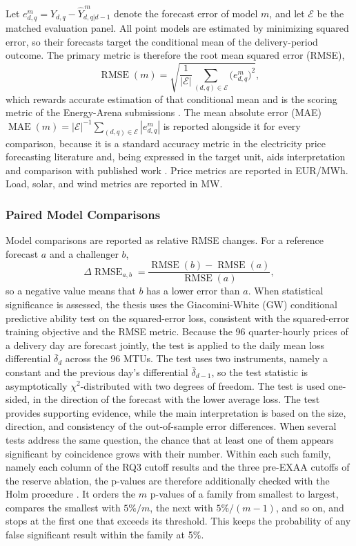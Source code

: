 Let \(e^{m}_{d,q} = Y_{d,q} - \hat{Y}^{\,m}_{d,q|d-1}\) denote the forecast
error of model \(m\), and let \(\mathcal{E}\) be the matched evaluation panel.
All point models are estimated by minimizing squared error, so their forecasts
target the conditional mean of the delivery-period outcome. The primary metric
is therefore the root mean squared error (RMSE),
\[
  \operatorname{RMSE}(m)
  =
  \sqrt{\frac{1}{|\mathcal{E}|}
  \sum_{(d,q)\in\mathcal{E}}
  \bigl(e^{m}_{d,q}\bigr)^{2}},
\]
which rewards accurate estimation of that conditional mean and is the scoring
metric of the Energy-Arena submissions \cite{kleinebrahm2026energyarena}. The
mean absolute error (MAE)
\(\operatorname{MAE}(m) = |\mathcal{E}|^{-1} \sum_{(d,q)\in\mathcal{E}}
|e^{m}_{d,q}|\) is reported alongside it for every comparison, because it is a
standard accuracy metric in the electricity price forecasting literature and,
being expressed in the target unit, aids interpretation and comparison with
published work \cite{lago2021forecasting,hyndman2006another}. Price metrics are
reported in EUR/MWh. Load, solar, and wind
metrics are reported in MW.

\subsubsection{Paired Model Comparisons}
\label{sec:paired_model_comparisons}

Model comparisons are reported as relative RMSE changes. For a reference
forecast \(a\) and a challenger \(b\),
\[
  \Delta\operatorname{RMSE}_{a,b}
  =
  \frac{\operatorname{RMSE}(b) - \operatorname{RMSE}(a)}{\operatorname{RMSE}(a)},
\]
so a negative value means that \(b\) has a lower error than \(a\). When
statistical significance is assessed, the thesis uses the Giacomini-White (GW)
conditional predictive ability test \cite{giacomini2006tests} on the
squared-error loss, consistent with the squared-error training objective and the
RMSE metric. Because the 96 quarter-hourly prices of a delivery day are
forecast jointly, the test is applied to the daily mean loss differential
\(\bar{\delta}_{d}\) across the 96 MTUs. The test uses two instruments,
namely a constant and the previous day's differential \(\bar{\delta}_{d-1}\), so
the test statistic is asymptotically \(\chi^{2}\)-distributed with two degrees of
freedom. The test is
used one-sided, in the direction of the forecast with the lower average loss. The test provides supporting evidence, while the
main interpretation is based on the size, direction, and consistency of the
out-of-sample error differences. When several tests address the same question,
the chance that at least one of them appears significant by coincidence grows
with their number. Within each such family, namely each column of the RQ3 cutoff
results and the three pre-EXAA cutoffs of the reserve ablation, the p-values are
therefore additionally checked with the Holm procedure \cite{holm1979simple}. It
orders the \(m\) p-values of a family from smallest to largest, compares the
smallest with \(5\%/m\), the next with \(5\%/(m-1)\), and so on, and stops at
the first one that exceeds its threshold. This keeps the probability of any
false significant result within the family at 5\%.

